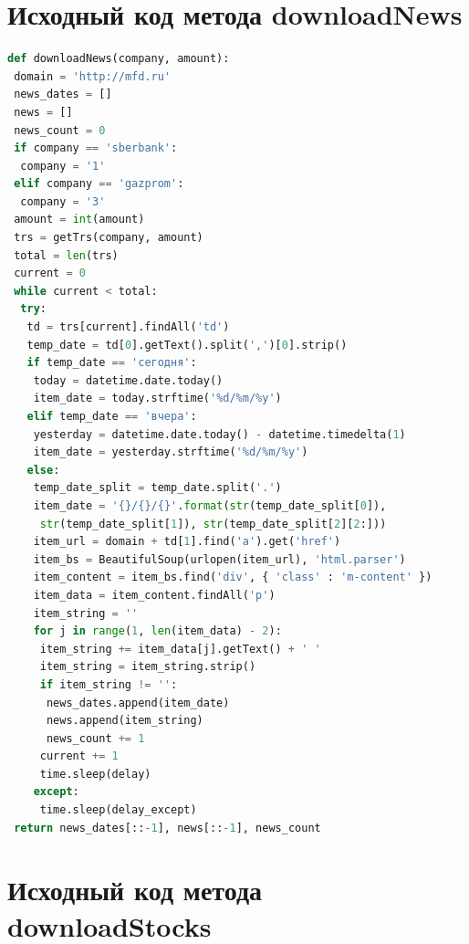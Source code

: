 \documentclass[14pt]{matmex-diploma-custom}
\begin{document}
\begin{appendices}

\section{Исходный код метода downloadNews}

\label{app:downloadNews}

\begin{footnotesize}
\begin{lstlisting}[language=Python]
def downloadNews(company, amount):
 domain = 'http://mfd.ru'
 news_dates = []
 news = []
 news_count = 0
 if company == 'sberbank':
  company = '1'
 elif company == 'gazprom':
  company = '3'
 amount = int(amount)
 trs = getTrs(company, amount)
 total = len(trs)
 current = 0
 while current < total:
  try:
   td = trs[current].findAll('td')
   temp_date = td[0].getText().split(',')[0].strip()
   if temp_date == 'сегодня':
    today = datetime.date.today()
    item_date = today.strftime('%d/%m/%y')
   elif temp_date == 'вчера':
    yesterday = datetime.date.today() - datetime.timedelta(1)
    item_date = yesterday.strftime('%d/%m/%y')
   else:
    temp_date_split = temp_date.split('.')
    item_date = '{}/{}/{}'.format(str(temp_date_split[0]),
     str(temp_date_split[1]), str(temp_date_split[2][2:]))
    item_url = domain + td[1].find('a').get('href')
    item_bs = BeautifulSoup(urlopen(item_url), 'html.parser')
    item_content = item_bs.find('div', { 'class' : 'm-content' })
    item_data = item_content.findAll('p')
    item_string = ''
    for j in range(1, len(item_data) - 2):
     item_string += item_data[j].getText() + ' '
     item_string = item_string.strip()
     if item_string != '':
      news_dates.append(item_date)
      news.append(item_string)
      news_count += 1
     current += 1
     time.sleep(delay)
    except:
     time.sleep(delay_except)
 return news_dates[::-1], news[::-1], news_count
\end{lstlisting}
\end{footnotesize}

\section{Исходный код метода downloadStocks}

\label{app:downloadStocks}


\end{appendices}
\end{document}

